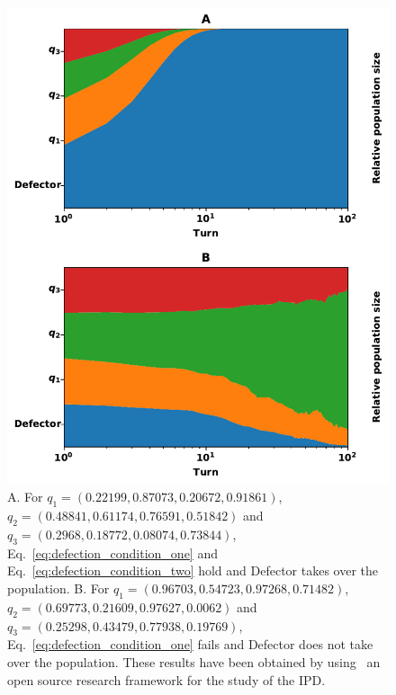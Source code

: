 \documentclass[10pt]{article}
\begin{document}
\begin{figure}[!htbp]
    \centering
    \includegraphics[width=.4\linewidth]{img/stability_of_defection_plots.pdf}
    \caption{A. For \(q_{1}=(0.22199, 0.87073, 0.20672, 0.91861)\),
    $q_{2}=(0.48841, 0.61174, 0.76591, 0.51842)$ and
    $q_{3}=(0.2968, 0.18772, 0.08074, 0.73844)$, Eq.~\ref{eq:defection_condition_one} and
    Eq.~\ref{eq:defection_condition_two} hold and Defector takes over the
    population. B. For $q_{1}=(0.96703, 0.54723, 0.97268, 0.71482)$,
    $q_{2}=(0.69773, 0.21609, 0.97627, 0.0062)$ and
    $q_{3}=(0.25298, 0.43479, 0.77938, 0.19769)$, Eq.~\ref{eq:defection_condition_one} fails
    and Defector does not take over the population.
    These results have been obtained by using~\cite{axelrodproject} an open
    source research framework for the study of the IPD.}\label{fig:stability_of_defection}
\end{figure}
\end{document}
